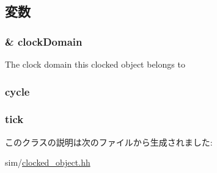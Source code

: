 \subsection{変数}
\hypertarget{classClockedObject_a17a99a3f3123d51a0fcd65c59a58763d}{
\subsubsection[{clockDomain}]{\& {\bf clockDomain}}}
\label{classClockedObject_a17a99a3f3123d51a0fcd65c59a58763d}
The clock domain this clocked object belongs to \hypertarget{classClockedObject_a5dd7a975aae396561aafab3faa698033}{
\subsubsection[{cycle}]{ {\bf cycle}}}
\label{classClockedObject_a5dd7a975aae396561aafab3faa698033}
\hypertarget{classClockedObject_a4daae57fbf09ee5423d123f5ce330e92}{
\subsubsection[{tick}]{ {\bf tick}}}
\label{classClockedObject_a4daae57fbf09ee5423d123f5ce330e92}


このクラスの説明は次のファイルから生成されました:\begin{DoxyCompactItemize}
\item 
sim/\hyperlink{clocked__object_8hh}{clocked\_\-object.hh}\end{DoxyCompactItemize}
